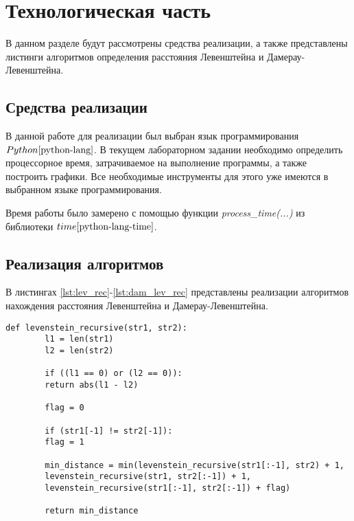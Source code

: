 \chapter{Технологическая часть}

В данном разделе будут рассмотрены средства реализации, а также представлены листинги алгоритмов определения расстояния Левенштейна и Дамерау-Левенштейна.

\section{Средства реализации}
В данной работе для реализации был выбран язык программирования $Python \cite{python-lang}$. В текущем лабораторном задании необходимо определить процессорное время, затрачиваемое на выполнение программы, а также построить графики. Все необходимые инструменты для этого уже имеются в выбранном языке программирования.

Время работы было замерено с помощью функции \textit{process\_time(...)} из библиотеки $time \cite{python-lang-time}$.


\section{Реализация алгоритмов}

В листингах \ref{lst:lev_rec}-\ref{lst:dam_lev_rec} представлены реализации алгоритмов нахождения расстояния Левенштейна и Дамерау-Левенштейна.

\clearpage

\begin{center}
	\captionsetup{justification=raggedright,singlelinecheck=off}
	\begin{lstlisting}[label=lst:lev_rec,caption=Алгоритм нахождения расстояния Левенштейна (рекурсивный)]
		def levenstein_recursive(str1, str2):
		l1 = len(str1)
		l2 = len(str2)
		
		if ((l1 == 0) or (l2 == 0)):
		return abs(l1 - l2)
		
		flag = 0
		
		if (str1[-1] != str2[-1]):
		flag = 1
		
		min_distance = min(levenstein_recursive(str1[:-1], str2) + 1,
		levenstein_recursive(str1, str2[:-1]) + 1,
		levenstein_recursive(str1[:-1], str2[:-1]) + flag)
		
		return min_distance
	\end{lstlisting}
\end{center}


